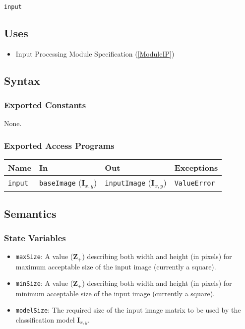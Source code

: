 \documentclass[12pt, titlepage]{article}
\def\code#1{\texttt{#1}}
\begin{document}
\code{input}

\subsection{Uses}

\begin{itemize}
  \item Input Processing Module Specification (\ref{ModuleIP})
\end{itemize}

\subsection{Syntax}

\subsubsection{Exported Constants}

None.

\subsubsection{Exported Access Programs}

\begin{center}
\begin{tabular}{p{2cm} p{4cm} p{4cm} p{2cm}}
\hline
\textbf{Name} & \textbf{In} & \textbf{Out} & \textbf{Exceptions} \\
\hline
\code{input} & \code{baseImage} ($\mathbf{I}_{x,y}$) & \code{inputImage} ($\mathbf{I}_{x,y}$) & \code{ValueError} \\
\hline
\end{tabular}
\end{center}

\subsection{Semantics}

\subsubsection{State Variables}
\begin{itemize}
\item \code{maxSize}: A value ($\mathbf{Z}_{+}$) describing both width and height (in pixels) for maximum acceptable 
size of the input image (currently a square).
\item \code{minSize}: A value ($\mathbf{Z}_{+}$) describing both width and height (in pixels) for minimum acceptable 
size of the input image (currently a square).
\item \code{modelSize}: The required size of the input image matrix to be used by the classification model $\mathbf{I}_{x,y}$.
\end{itemize}
\end{document}
